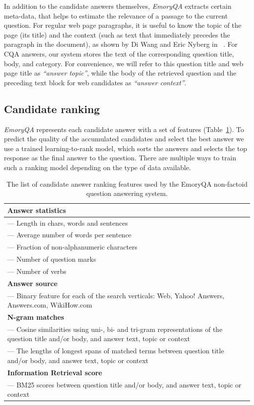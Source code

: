 In addition to the candidate answers themselves, \textit{EmoryQA} extracts certain meta-data, that helps to estimate the relevance of a passage to the current question.
For regular web page paragraphs, it is useful to know the topic of the page (\eg its title) and the context (such as text that immediately precedes the paragraph in the document), as shown by Di Wang and Eric Nyberg in ~\cite{wang2015cmu}.
For CQA answers, our system stores the text of the corresponding question title, body, and category.
For convenience, we will refer to this question title and web page title as \textit{``answer topic''}, while the body of the retrieved question and the preceding text block for web candidates as \textit{``answer context''}.

\subsection{Candidate ranking}
\label{section:non-factoid:system:ranking}

\textit{EmoryQA} represents each candidate answer with a set of features (Table~\ref{table:non-factoid:system:features}).
To predict the quality of the accumulated candidates and select the best answer we use a trained learning-to-rank model, which sorts the answers and selects the top response as the final answer to the question.
There are multiple ways to train such a ranking model depending on the type of data available.

\begin{table}[t]
\centering
\small
\begin{tabular}{p{13cm}}

\textbf{Answer statistics} \\
\hline
--- Length in chars, words and sentences \\
--- Average number of words per sentence \\
--- Fraction of non-alphanumeric characters  \\
--- Number of question marks \\
--- Number of verbs  \\
\hline
\textbf{Answer source} \\
\hline
--- Binary feature for each of the search verticals: Web, Yahoo! Answers, Answers.com, WikiHow.com \\
\hline
\textbf{N-gram matches}\\
\hline
--- Cosine similarities using uni-, bi- and tri-gram representations of the question title and/or body, and answer text, topic or context\\
--- The lengths of longest spans of matched terms between question title and/or body, and answer text, topic or context\\
\hline
\textbf{Information Retrieval score}\\
\hline
--- BM25 scores between question title and/or body, and answer text, topic or context\\ 
\end{tabular}
\caption{The list of candidate answer ranking features used by the EmoryQA non-factoid question answering system.}
\label{table:non-factoid:system:features}
\end{table}

